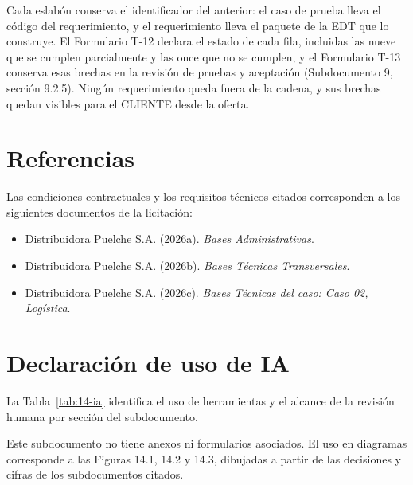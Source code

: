 
Cada eslabón conserva el identificador del anterior: el caso de prueba lleva el código del requerimiento, y el requerimiento lleva el paquete de la EDT que lo construye. El Formulario T-12 declara el estado de cada fila, incluidas las nueve que se cumplen parcialmente y las once que no se cumplen, y el Formulario T-13 conserva esas brechas en la revisión de pruebas y aceptación (Subdocumento 9, sección 9.2.5). Ningún requerimiento queda fuera de la cadena, y sus brechas quedan visibles para el CLIENTE desde la oferta.

\section*{Referencias}
{}

Las condiciones contractuales y los requisitos técnicos citados corresponden a los siguientes documentos de la licitación:

\begin{itemize}
\item Distribuidora Puelche S.A. (2026a). \emph{Bases Administrativas}.
\item Distribuidora Puelche S.A. (2026b). \emph{Bases Técnicas Transversales}.
\item Distribuidora Puelche S.A. (2026c). \emph{Bases Técnicas del caso: Caso 02, Logística}.
\end{itemize}

\clearpage
\section*{Declaración de uso de IA}
{}

La Tabla~\ref{tab:14-ia} identifica el uso de herramientas y el alcance de la revisión humana por sección del subdocumento.


Este subdocumento no tiene anexos ni formularios asociados. El uso en diagramas corresponde a las Figuras 14.1, 14.2 y 14.3, dibujadas a partir de las decisiones y cifras de los subdocumentos citados.
